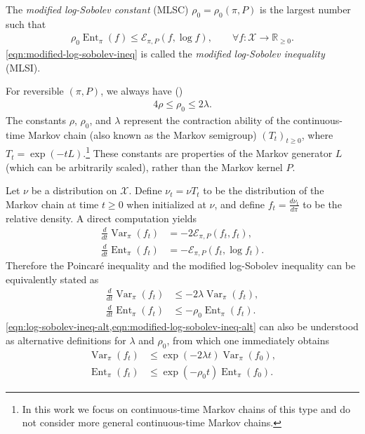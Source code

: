 \documentclass[11pt]{article}
\def\bR{\mathbb{R}}
\def\cE{\mathcal{E}}
\def\cX{\mathcal{X}}
\DeclareMathOperator\Var{\mathrm{Var}}
\DeclareMathOperator\Ent{\mathrm{Ent}}
\theoremstyle{definition}
\begin{document}
The \emph{modified log-Sobolev constant} (MLSC) $\rho_0=\rho_0(\pi, P)$ is the largest number such that
\begin{align} \label{eqn:modified-log-sobolev-ineq}
  \rho_0 \Ent_\pi(f) \le \cE_{\pi,P}(f, \log f), \qquad \forall f: \cX \to \bR_{\ge 0}.
\end{align}
\cref{eqn:modified-log-sobolev-ineq} is called the \emph{modified log-Sobolev inequality} (MLSI).

For reversible $(\pi, P)$, we always have (\cite{diaconis1996logarithmic,bobkov2006modified})
\begin{align} \label{eqn:rho-rho0-lambda-comparison}
  4\rho \le \rho_0 \le 2\lambda.
\end{align}
The constants $\rho$, $\rho_0$, and $\lambda$ represent the contraction ability of the continuous-time Markov chain (also known as the Markov semigroup) $(T_t)_{t\ge 0}$, where $T_t = \exp(-t L)$.\footnote{In this work we focus on continuous-time Markov chains of this type and do not consider more general continuous-time Markov chains.}
These constants are properties of the Markov generator $L$ (which can be arbitrarily scaled), rather than the Markov kernel $P$.

Let $\nu$ be a distribution on $\cX$.
Define $\nu_t = \nu T_t$ to be the distribution of the Markov chain at time $t \ge 0$ when initialized at $\nu$, and define $f_t = \frac{d\nu_t}{d\pi}$ to be the relative density.
A direct computation yields
\begin{align}
  \frac{d}{dt} \Var_\pi(f_t) &= -2\cE_{\pi,P}(f_t, f_t), \\
  \frac{d}{dt} \Ent_\pi(f_t) &= -\cE_{\pi,P}(f_t, \log f_t).
\end{align}
Therefore the Poincar\'e inequality and the modified log-Sobolev inequality can be equivalently stated as
\begin{align}
    \label{eqn:log-sobolev-ineq-alt} \frac{d}{dt} \Var_\pi(f_t) &\le -2 \lambda \Var_\pi(f_t), \\
    \label{eqn:modified-log-sobolev-ineq-alt} \frac{d}{dt} \Ent_\pi(f_t) &\le -\rho_0 \Ent_\pi(f_t).
\end{align}
\cref{eqn:log-sobolev-ineq-alt,eqn:modified-log-sobolev-ineq-alt} can also be understood as alternative definitions for $\lambda$ and $\rho_0$, from which one immediately obtains
\begin{align}
  \label{eqn:lambda-ineq} \Var_\pi(f_t) &\le \exp(-2\lambda t) \Var_\pi(f_0),  \\
  \label{eqn:rho0-ineq} \Ent_\pi(f_t) &\le \exp(-\rho_0 t) \Ent_\pi(f_0).
\end{align}
\end{document}
